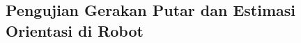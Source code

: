 \subsection{Pengujian Gerakan Putar dan Estimasi Orientasi di Robot}
\label{subsec:putarrobot}

\textcolor{red}{\lipsum[1-2]}

